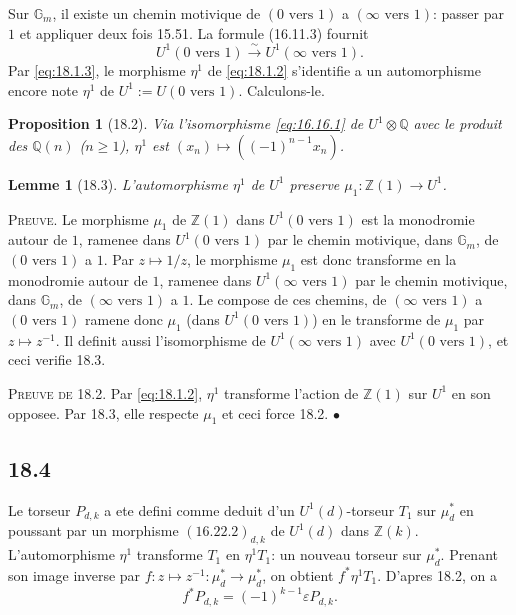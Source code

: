 \documentclass[12pt,a4paper]{article}
\theoremstyle{plain}
\newtheorem{lemma}[theorem]{Lemme}
\newtheorem{proposition}[theorem]{Proposition}
\theoremstyle{definition}
\theoremstyle{remark}
\newcommand{\Gm}{\mathbb{G}_m}
\newcommand{\ZZ}{\mathbb{Z}}
\newcommand{\QQ}{\mathbb{Q}}
\begin{document}
Sur $\Gm$, il existe un chemin motivique de $(0 \text{ vers } 1)$ a
$(\infty \text{ vers } 1)$: passer par $1$ et appliquer deux fois 15.51.
La formule (16.11.3) fournit
\begin{equation}\label{eq:18.1.3}
U^1(0 \text{ vers } 1) \xrightarrow{\sim} U^1(\infty \text{ vers } 1).
\end{equation}
Par \eqref{eq:18.1.3}, le morphisme $\eta^1$ de \eqref{eq:18.1.2}
s'identifie a un automorphisme encore note $\eta^1$ de
$U^1 := U(0 \text{ vers } 1)$. Calculons-le.

\begin{proposition}[18.2]\label{prop:18.2}
Via l'isomorphisme \eqref{eq:16.16.1} de $U^1 \otimes \QQ$ avec le
produit des $\QQ(n)$ ($n \geq 1$), $\eta^1$ est
$(x_n) \mapsto ((-1)^{n-1} x_n)$.
\end{proposition}

\begin{lemma}[18.3]\label{lem:18.3}
L'automorphisme $\eta^1$ de $U^1$ preserve $\mu_1 : \ZZ(1) \to U^1$.
\end{lemma}

\noindent \textsc{Preuve.} Le morphisme $\mu_1$ de $\ZZ(1)$ dans
$U^1(0 \text{ vers } 1)$ est la monodromie autour de $1$, ramenee dans
$U^1(0 \text{ vers } 1)$ par le chemin motivique, dans $\Gm$, de
$(0 \text{ vers } 1)$ a $1$. Par $z \mapsto 1/z$, le morphisme
$\mu_1$ est donc transforme en la monodromie autour de $1$, ramenee
dans $U^1(\infty \text{ vers } 1)$ par le chemin motivique, dans $\Gm$,
de $(\infty \text{ vers } 1)$ a $1$. Le compose de ces chemins, de
$(\infty \text{ vers } 1)$ a $(0 \text{ vers } 1)$ ramene donc $\mu_1$
(dans $U^1(0 \text{ vers } 1)$) en le transforme de $\mu_1$ par
$z \mapsto z^{-1}$. Il definit aussi l'isomorphisme de
$U^1(\infty \text{ vers } 1)$ avec $U^1(0 \text{ vers } 1)$, et ceci
verifie 18.3.

\noindent \textsc{Preuve de 18.2.} Par \eqref{eq:18.1.2}, $\eta^1$
transforme l'action de $\ZZ(1)$ sur $U^1$ en son opposee. Par 18.3,
elle respecte $\mu_1$ et ceci force 18.2. \hfill $\bullet$

\subsection{18.4}

Le torseur $P_{d,k}$ a ete defini comme deduit d'un $U^1(d)$-torseur
$T_1$ sur $\mu_d^*$ en poussant par un morphisme
$(16.22.2)_{d,k}$ de $U^1(d)$ dans $\ZZ(k)$. L'automorphisme
$\eta^1$ transforme $T_1$ en $\eta^1 T_1$: un nouveau torseur sur
$\mu_d^*$. Prenant son image inverse par
$f : z \mapsto z^{-1} : \mu_d^* \to \mu_d^*$, on obtient
$f^*\eta^1 T_1$. D'apres 18.2, on a
\[
f^*P_{d,k} = (-1)^{k-1} \varepsilon P_{d,k}.
\]
\end{document}

